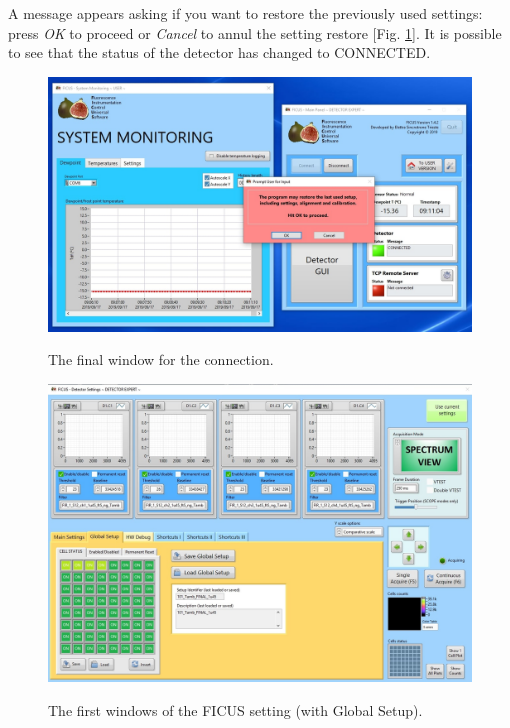 \documentclass[a4paper,12pt,oneside,pdflatex,italian,final,twocolumn]{article}
\begin{document}
A message appears asking if you want to restore the previously used settings: press \textit{OK} to proceed or \textit{Cancel} to annul the setting restore [Fig. \ref{fig:fig6}]. It is possible to see that the status of the detector has changed to CONNECTED.

\begin{figure}[h]
\centering
{\includegraphics[width=.95\textwidth]{Capture4.jpg}} \quad
\caption{The final window for the connection.}\label{fig:fig6}
\end{figure}

\begin{figure}[h!]
\centering
{\includegraphics[width=.95\textwidth]{Capture8.jpg}} \quad
\caption{The first windows of the FICUS setting (with Global Setup).}\label{fig:fig7}
\end{figure}
\end{document}
